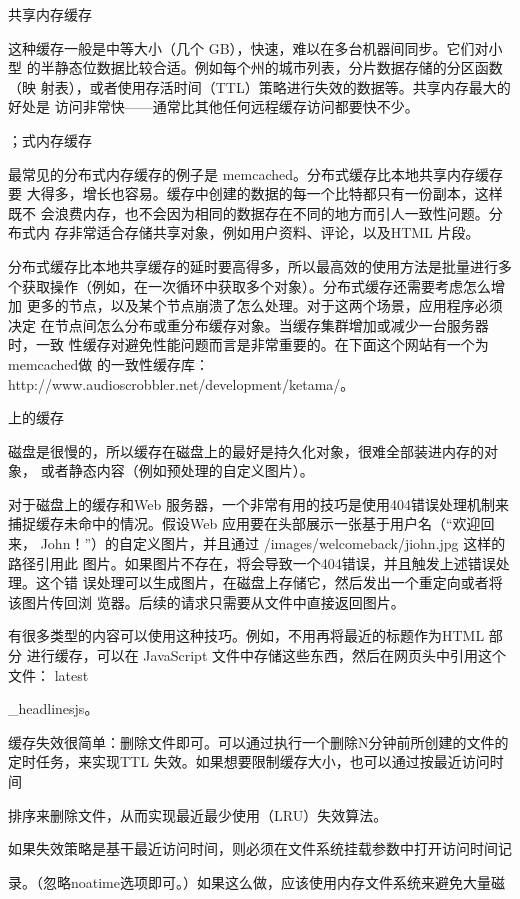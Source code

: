 共享内存缓存

这种缓存一般是中等大小（几个 GB），快速，难以在多台机器间同步。它们对小型
的半静态位数据比较合适。例如每个州的城市列表，分片数据存储的分区函数（映
射表），或者使用存活时间（TTL）策略进行失效的数据等。共享内存最大的好处是
访问非常快——通常比其他任何远程缓存访问都要快不少。

；式内存缓存

最常见的分布式内存缓存的例子是 memcached。分布式缓存比本地共享内存缓存要
大得多，增长也容易。缓存中创建的数据的每一个比特都只有一份副本，这样既不
会浪费内存，也不会因为相同的数据存在不同的地方而引人一致性问题。分布式内
存非常适合存储共享对象，例如用户资料、评论，以及HTML 片段。

分布式缓存比本地共享缓存的延时要高得多，所以最高效的使用方法是批量进行多
个获取操作（例如，在一次循环中获取多个对象）。分布式缓存还需要考虑怎么增加
更多的节点，以及某个节点崩溃了怎么处理。对于这两个场景，应用程序必须决定
在节点间怎么分布或重分布缓存对象。当缓存集群增加或减少一台服务器时，一致
性缓存对避免性能问题而言是非常重要的。在下面这个网站有一个为memcached做
的一致性缓存库：http://www.audioscrobbler.net/development/ketama/。

上的缓存

磁盘是很慢的，所以缓存在磁盘上的最好是持久化对象，很难全部装进内存的对象，
或者静态内容（例如预处理的自定义图片）。

对于磁盘上的缓存和Web 服务器，一个非常有用的技巧是使用404错误处理机制来
捕捉缓存未命中的情况。假设Web 应用要在头部展示一张基于用户名（“欢迎回来，
John！”）的自定义图片，并且通过 /images/welcomeback/jiohn.jpg 这样的路径引用此
图片。如果图片不存在，将会导致一个404错误，并且触发上述错误处理。这个错
误处理可以生成图片，在磁盘上存储它，然后发出一个重定向或者将该图片传回浏
览器。后续的请求只需要从文件中直接返回图片。

有很多类型的内容可以使用这种技巧。例如，不用再将最近的标题作为HTML 部分
进行缓存，可以在 JavaScript 文件中存储这些东西，然后在网页头中引用这个文件：
latest

\_headlinesjs。

缓存失效很简单：删除文件即可。可以通过执行一个删除N分钟前所创建的文件的
定时任务，来实现TTL 失效。如果想要限制缓存大小，也可以通过按最近访问时间

排序来删除文件，从而实现最近最少使用（LRU）失效算法。

如果失效策略是基干最近访问时间，则必须在文件系统挂载参数中打开访问时间记

录。（忽略noatime选项即可。）如果这么做，应该使用内存文件系统来避免大量磁

